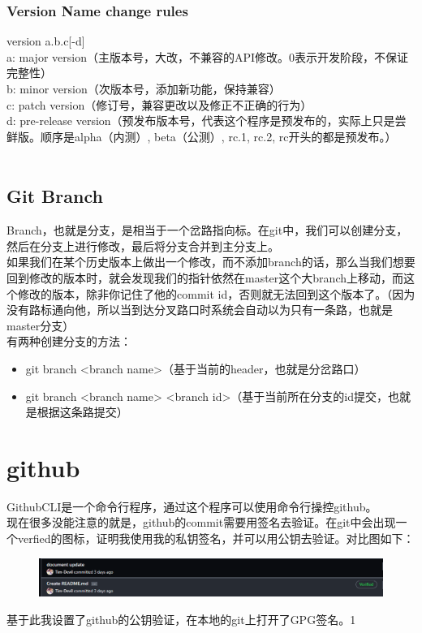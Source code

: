 \documentclass{article}
\begin{document}
\subsubsection{Version Name change rules}
version a.b.c[-d]\\
a: major version（主版本号，大改，不兼容的API修改。0表示开发阶段，不保证完整性）\\
b: minor version（次版本号，添加新功能，保持兼容）\\
c: patch version（修订号，兼容更改以及修正不正确的行为）\\
d: pre-release version（预发布版本号，代表这个程序是预发布的，实际上只是尝鲜版。顺序是alpha（内测）, beta（公测）, rc.1, rc.2, rc开头的都是预发布。）\\
\\
\subsection{Git Branch}
Branch，也就是分支，是相当于一个岔路指向标。在git中，我们可以创建分支，然后在分支上进行修改，最后将分支合并到主分支上。\\
如果我们在某个历史版本上做出一个修改，而不添加branch的话，那么当我们想要回到修改的版本时，就会发现我们的指针依然在master这个大branch上移动，而这个修改的版本，除非你记住了他的commit id，否则就无法回到这个版本了。（因为没有路标通向他，所以当到达分叉路口时系统会自动以为只有一条路，也就是master分支）\\
有两种创建分支的方法：\\
\begin{itemize}
    \item git branch <branch name>（基于当前的header，也就是分岔路口）
    \item git branch <branch name> <branch id>（基于当前所在分支的id提交，也就是根据这条路提交）
\end{itemize}
\section{github}
\noindent
GithubCLI是一个命令行程序，通过这个程序可以使用命令行操控github。\\
现在很多没能注意的就是，github的commit需要用签名去验证。在git中会出现一个verfied的图标，证明我使用我的私钥签名，并可以用公钥去验证。对比图如下：\\
\begin{figure}[h]
    \centering
    \includegraphics[width=\textwidth]{pic1_verfied.png}\\
\end{figure}
基于此我设置了github的公钥验证，在本地的git上打开了GPG签名。1
\end{document}
